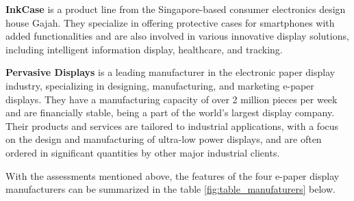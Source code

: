 \documentclass[../Main.tex]{subfiles}
\begin{document}
\textbf{InkCase} is a product line from the Singapore-based consumer electronics design house Gajah. They specialize in offering protective cases for smartphones with added functionalities and are also involved in various innovative display solutions, including intelligent information display, healthcare, and tracking\cite{inkcase}. 

\textbf{Pervasive Displays} is a leading manufacturer in the electronic paper display industry, specializing in designing, manufacturing, and marketing e-paper displays. They have a manufacturing capacity of over 2 million pieces per week and are financially stable, being a part of the world's largest display company\cite{pvsdp}. Their products and services are tailored to industrial applications, with a focus on the design and manufacturing of ultra-low power displays, and are often ordered in significant quantities by other major industrial clients.

With the assessments mentioned above, the features of the four e-paper display manufacturers can be summarized in the table \ref{fig:table_manufaturers} below.
\end{document}
